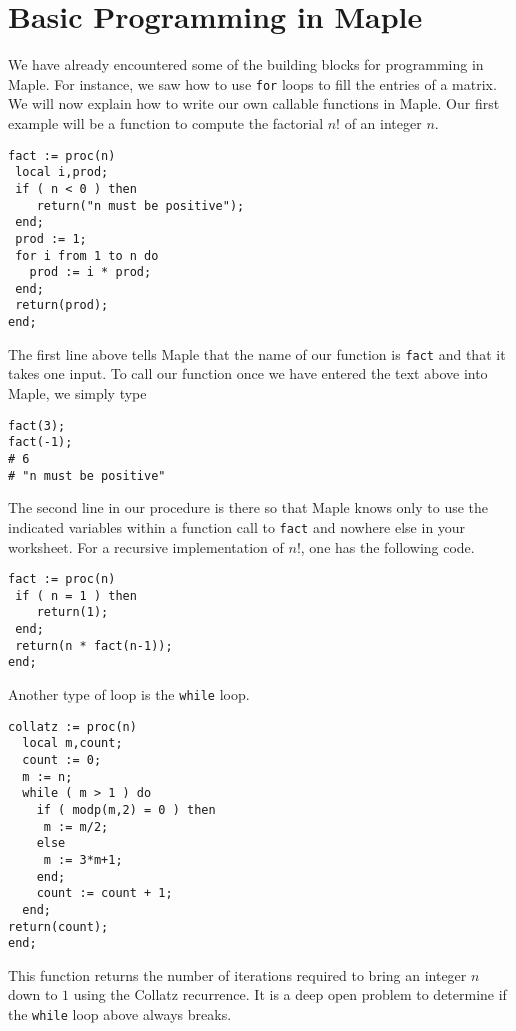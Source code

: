 \documentclass[12pt]{amsart}
\begin{document}
\section{Basic Programming in Maple}

We have already encountered some of the building blocks for programming in Maple.  For instance,
we saw how to use \texttt{for} loops to fill the entries of a matrix.  We will now explain how to 
write our own callable functions in Maple.  Our first example will be a function to compute
the factorial $n!$ of an integer $n$.

\begin{verbatim}
fact := proc(n)
 local i,prod;
 if ( n < 0 ) then 
    return("n must be positive");
 end;	   
 prod := 1;
 for i from 1 to n do 
   prod := i * prod;    
 end;
 return(prod);
end; 
\end{verbatim}

The first line above tells Maple that the name of our function is \texttt{fact} and that it takes one input. 
To call our function once we have entered the text above into Maple, we simply type

\begin{verbatim}
fact(3);
fact(-1); 
# 6
# "n must be positive"
\end{verbatim}

The second line in our procedure is there so that Maple knows only to use the indicated variables within
a function call to \texttt{fact} and nowhere else in your worksheet.  For a recursive
implementation of $n!$, one has the following code.

\begin{verbatim}
fact := proc(n)
 if ( n = 1 ) then 
    return(1);
 end;	   
 return(n * fact(n-1));
end; 
\end{verbatim}

Another type of loop is the \texttt{while} loop.  

\begin{verbatim}
collatz := proc(n)
  local m,count;
  count := 0;
  m := n;
  while ( m > 1 ) do 
    if ( modp(m,2) = 0 ) then
     m := m/2;
    else 
     m := 3*m+1;
    end;
    count := count + 1;
  end;
return(count);
end;
\end{verbatim}

This function returns the number of iterations required to bring an integer $n$ down to
$1$ using the Collatz recurrence.  It is a deep open problem to determine if the \texttt{while} loop
above always breaks.
\end{document}
